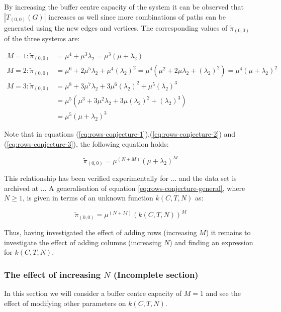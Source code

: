 By increasing the buffer centre capacity of the system it can be observed that 
\(|T_{(0,0)}(G)|\) increases as well since more combinations of paths can be 
generated using the new edges and vertices. 
The corresponding values of \(\tilde{\pi}_{(0,0)}\) of the three systems are:

\begin{align}
    M = 1: \tilde{\pi}_{(0,0)} &= \mu^4 + \mu^3 \lambda_2 = 
    \mu^3 (\mu + \lambda_2) \label{eq:rows-conjecture-1}\\
    M = 2: \tilde{\pi}_{(0,0)} &= \mu^6 + 2\mu^5 \lambda_2 + \mu^4 (\lambda_2)^2 
    = \mu^4(\mu^2 + 2\mu \lambda_2 + (\lambda_2)^2) 
    = \mu^4 (\mu + \lambda_2) ^ 2 \label{eq:rows-conjecture-2}\\
    M = 3: \tilde{\pi}_{(0,0)} &= \mu^8 + 3 \mu^7 \lambda_2 + 
    3 \mu^6 (\lambda_2)^2 + \mu^5(\lambda_2)^3 \nonumber \\
    &= \mu^5 (\mu^3 + 3 \mu ^2 \lambda_2 + 3 \mu (\lambda_2)^2 + (\lambda_2)^3) 
    \nonumber \\
    &= \mu^5 (\mu + \lambda_2) ^ 3 \label{eq:rows-conjecture-3}
\end{align}

Note that in equations (\ref{eq:rows-conjecture-1}),(\ref{eq:rows-conjecture-2}) 
and (\ref{eq:rows-conjecture-3}), the following equation holds: 

\begin{equation}\label{eq:rows-conjecture-general}
    \tilde{\pi}_{(0,0)} = \mu^{(N+M)} (\mu + \lambda_2)^M
\end{equation}

This relationship has been verified experimentally for ... and the data set is 
archived at ... 
A generalisation of equation \ref{eq:rows-conjecture-general}, where \(N \geq 1\), 
is given in terms of an unknown function \(k(C,T,N)\) as:

\begin{equation}
    \tilde{\pi}_{(0,0)} = \mu^{(N+M)} (k(C,T,N))^M
\end{equation}

Thus, having investigated the effect of adding rows (increasing \(M\)) it remains 
to investigate the effect of adding columns (increasing \(N\)) and finding an 
expression for \(k(C,T,N)\).

\subsubsection{The effect of increasing \(N\) (Incomplete section)}
In this section we will consider a buffer centre capacity of \(M=1\) and see the 
effect 
of modifying other parameters on \(k(C, T, N)\).

